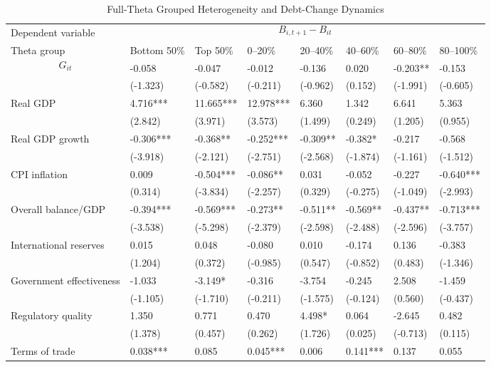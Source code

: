 \begin{table}[H]\centering
\begin{threeparttable}
\caption{Full-Theta Grouped Heterogeneity and Debt-Change Dynamics}
\label{tab:theta_group_heterogeneity_debt}
\scriptsize
\begin{tabularx}{\textwidth}{lYYYYYYY}
\toprule
Dependent variable &  \\
\cmidrule(lr){2-8}
Theta group & Bottom 50\% & Top 50\% & 0--20\% & 20--40\% & 40--60\% & 60--80\% & 80--100\% \\
\midrule
$$G_{it}$$ & -0.058 & -0.047 & -0.012 & -0.136 & 0.020 & -0.203** & -0.153 \\
  & (-1.323) & (-0.582) & (-0.211) & (-0.962) & (0.152) & (-1.991) & (-0.605) \\
Real GDP & 4.716*** & 11.665*** & 12.978*** & 6.360 & 1.342 & 6.641 & 5.363 \\
  & (2.842) & (3.971) & (3.573) & (1.499) & (0.249) & (1.205) & (0.955) \\
Real GDP growth & -0.306*** & -0.368** & -0.252*** & -0.309** & -0.382* & -0.217 & -0.568 \\
  & (-3.918) & (-2.121) & (-2.751) & (-2.568) & (-1.874) & (-1.161) & (-1.512) \\
CPI inflation & 0.009 & -0.504*** & -0.086** & 0.031 & -0.052 & -0.227 & -0.640*** \\
  & (0.314) & (-3.834) & (-2.257) & (0.329) & (-0.275) & (-1.049) & (-2.993) \\
Overall balance/GDP & -0.394*** & -0.569*** & -0.273** & -0.511** & -0.569** & -0.437** & -0.713*** \\
  & (-3.538) & (-5.298) & (-2.379) & (-2.598) & (-2.488) & (-2.596) & (-3.757) \\
International reserves & 0.015 & 0.048 & -0.080 & 0.010 & -0.174 & 0.136 & -0.383 \\
  & (1.204) & (0.372) & (-0.985) & (0.547) & (-0.852) & (0.483) & (-1.346) \\
Government effectiveness & -1.033 & -3.149* & -0.316 & -3.754 & -0.245 & 2.508 & -1.459 \\
  & (-1.105) & (-1.710) & (-0.211) & (-1.575) & (-0.124) & (0.560) & (-0.437) \\
Regulatory quality & 1.350 & 0.771 & 0.470 & 4.498* & 0.064 & -2.645 & 0.482 \\
  & (1.378) & (0.457) & (0.262) & (1.726) & (0.025) & (-0.713) & (0.115) \\
Terms of trade & 0.038*** & 0.085 & 0.045*** & 0.006 & 0.141*** & 0.137 & 0.055 \\

\end{tabularx}
\end{threeparttable}
\end{table}
